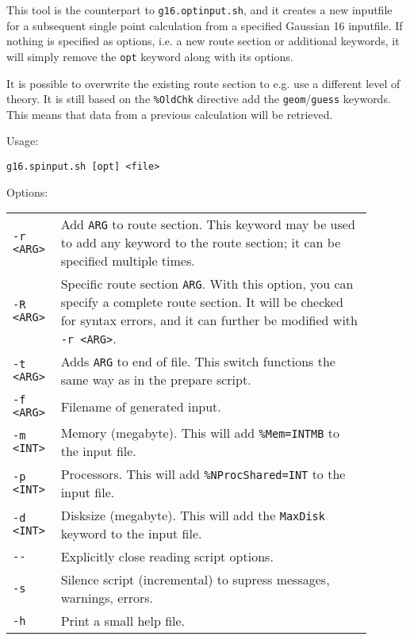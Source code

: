 \documentclass[   %
  final,          %
  a4paper         %
]{article}
\begin{document}
This tool is the counterpart to {\lstinline`g16.optinput.sh`}, 
and it creates a new inputfile for a subsequent single point calculation
from a specified Gaussian 16 inputfile.
If nothing is specified as options, i.e. a new route section or additional keywords,
it will simply remove the \texttt{opt} keyword along with its options.

It is possible to overwrite the existing route section to e.g. use a different level of theory.
It is still based on the \texttt{\%OldChk} directive add the \texttt{geom}/\texttt{guess} keywords.
This means that data from a previous calculation will be retrieved.

Usage: 

\lstinline`g16.spinput.sh [opt] <file>`

Options:

\begin{longtable}{p{0.1\linewidth}p{0.8\linewidth}}
  {\lstinline`-r <ARG>`} & Add {\lstinline`ARG`} to route section. 
    This keyword may be used to add any keyword to the route section; 
    it can be specified multiple times.\\
  {\lstinline`-R <ARG>`} & Specific route section {\lstinline`ARG`}. 
    With this option, you can specify a complete route section. 
    It will be checked for syntax errors, and it can further be modified with {\lstinline`-r <ARG>`}. \\
  {\lstinline`-t <ARG>`} & Adds {\lstinline`ARG`} to end of file. 
    This switch functions the same way as in the prepare script. \\
  {\lstinline`-f <ARG>`} & Filename of generated input. \\
  {\lstinline`-m <INT>`} & Memory (megabyte). This will add \texttt{\%Mem={\lstinline`INT`}MB} to the input file. \\
  {\lstinline`-p <INT>`} & Processors. This will add \texttt{\%NProcShared={\lstinline`INT`}} to the input file. \\
  {\lstinline`-d <INT>`} & Disksize (megabyte). This will add the \texttt{MaxDisk} keyword to the input file. \\
  {\lstinline`--`}       & Explicitly close reading script options. \\
  {\lstinline`-s`}       & Silence script (incremental) to supress messages, warnings, errors. \\
  {\lstinline`-h`}       & Print a small help file. \\
\end{longtable}
\end{document}
